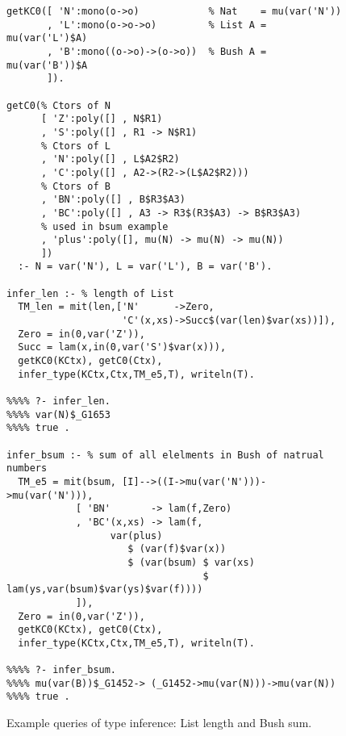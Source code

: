 \documentclass[runningheads,a4paper]{llncs}
\newcommand{\TODO}[1]{\textcolor{magenta}{TODO: #1}}
\begin{document}


\begin{figure}\small
\begin{verbatim}
getKC0([ 'N':mono(o->o)            % Nat    = mu(var('N'))
       , 'L':mono(o->o->o)         % List A = mu(var('L')$A)
       , 'B':mono((o->o)->(o->o))  % Bush A = mu(var('B'))$A
       ]).

getC0(% Ctors of N
      [ 'Z':poly([] , N$R1)
      , 'S':poly([] , R1 -> N$R1)
      % Ctors of L
      , 'N':poly([] , L$A2$R2)
      , 'C':poly([] , A2->(R2->(L$A2$R2)))
      % Ctors of B
      , 'BN':poly([] , B$R3$A3)
      , 'BC':poly([] , A3 -> R3$(R3$A3) -> B$R3$A3)
      % used in bsum example
      , 'plus':poly([], mu(N) -> mu(N) -> mu(N))
      ])
  :- N = var('N'), L = var('L'), B = var('B').

infer_len :- % length of List
  TM_len = mit(len,['N'      ->Zero,
                    'C'(x,xs)->Succ$(var(len)$var(xs))]),
  Zero = in(0,var('Z')),
  Succ = lam(x,in(0,var('S')$var(x))),
  getKC0(KCtx), getC0(Ctx),
  infer_type(KCtx,Ctx,TM_e5,T), writeln(T).

%%%% ?- infer_len.
%%%% var(N)$_G1653
%%%% true .

infer_bsum :- % sum of all elelments in Bush of natrual numbers
  TM_e5 = mit(bsum, [I]-->((I->mu(var('N')))->mu(var('N'))),
            [ 'BN'       -> lam(f,Zero)
            , 'BC'(x,xs) -> lam(f,
                  var(plus)
                     $ (var(f)$var(x))
                     $ (var(bsum) $ var(xs)
                                  $ lam(ys,var(bsum)$var(ys)$var(f))))
            ]),
  Zero = in(0,var('Z')),
  getKC0(KCtx), getC0(Ctx),
  infer_type(KCtx,Ctx,TM_e5,T), writeln(T).

%%%% ?- infer_bsum.
%%%% mu(var(B))$_G1452-> (_G1452->mu(var(N)))->mu(var(N))
%%%% true .
\end{verbatim}
\caption{Example queries of type inference: List length and Bush sum.}
\label{fig:TIexample}
\end{figure}
\end{document}
